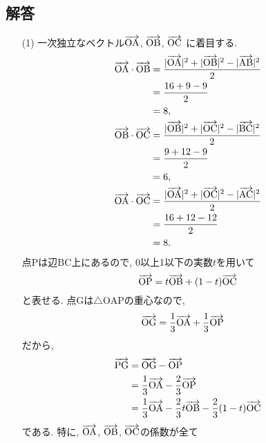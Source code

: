 \documentclass[dvipdfmx,a4paper]{jsarticle}
\begin{document}
    \subsection{解答}
    \begin{itemize}
        \item [(1)] 一次独立なベクトル$\overrightarrow{\mathrm{OA}}$, $\overrightarrow{\mathrm{OB}}$, $\overrightarrow{\mathrm{OC}}$
        に着目する. 
        \begin{align*}
            \overrightarrow{\mathrm{OA}} \cdot \overrightarrow{\mathrm{OB}}
            &= \dfrac{|\overrightarrow{\mathrm{OA}}|^2 + |\overrightarrow{\mathrm{OB}}|^2 - |\overrightarrow{\mathrm{AB}}|^2}{2} \\
            &= \dfrac{16 + 9 - 9}{2} \\
            &= 8, \\
            \overrightarrow{\mathrm{OB}} \cdot \overrightarrow{\mathrm{OC}}
            &= \dfrac{|\overrightarrow{\mathrm{OB}}|^2 + |\overrightarrow{\mathrm{OC}}|^2 - |\overrightarrow{\mathrm{BC}}|^2}{2} \\
            &= \dfrac{9 + 12 - 9}{2} \\
            &= 6, \\
            \overrightarrow{\mathrm{OA}} \cdot \overrightarrow{\mathrm{OC}}
            &= \dfrac{|\overrightarrow{\mathrm{OA}}|^2 + |\overrightarrow{\mathrm{OC}}|^2 - |\overrightarrow{\mathrm{AC}}|^2}{2} \\
            &= \dfrac{16 + 12 - 12}{2} \\
            &= 8.
        \end{align*}
        点Pは辺BC上にあるので, 0以上1以下の実数$t$を用いて
        \begin{equation*}
            \overrightarrow{\mathrm{OP}} = t\overrightarrow{\mathrm{OB}} + (1-t)\overrightarrow{\mathrm{OC}}
        \end{equation*}
        と表せる. 点Gは$\triangle \mathrm{OAP}$の重心なので, 
        \begin{align*}
            \overrightarrow{\mathrm{OG}} &= \dfrac{1}{3}\overrightarrow{\mathrm{OA}} + \dfrac{1}{3}\overrightarrow{\mathrm{OP}}
        \end{align*}
        だから, 
        \begin{align*}
            \overrightarrow{\mathrm{PG}} &= \overrightarrow{\mathrm{OG}} - \overrightarrow{\mathrm{OP}} \\
            &= \dfrac{1}{3}\overrightarrow{\mathrm{OA}} - \dfrac{2}{3}\overrightarrow{\mathrm{OP}} \\
            &= \dfrac{1}{3}\overrightarrow{\mathrm{OA}} - \dfrac{2}{3}t\overrightarrow{\mathrm{OB}} - \dfrac{2}{3} (1-t)\overrightarrow{\mathrm{OC}}
        \end{align*}
        である. 特に, $\overrightarrow{\mathrm{OA}}$, $\overrightarrow{\mathrm{OB}}$, $\overrightarrow{\mathrm{OC}}$の係数が全て

\end{itemize}
\end{document}
